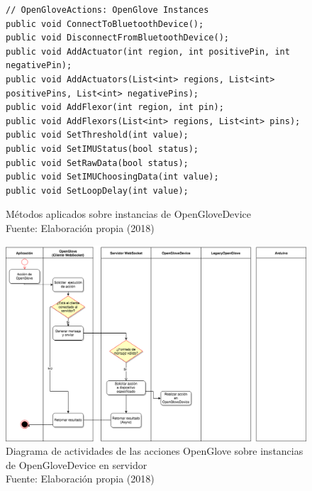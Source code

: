 \begin{figure}[H]
  \begin{center} 
\begin{lstlisting}
// OpenGloveActions: OpenGlove Instances
public void ConnectToBluetoothDevice();
public void DisconnectFromBluetoothDevice();
public void AddActuator(int region, int positivePin, int negativePin);
public void AddActuators(List<int> regions, List<int> positivePins, List<int> negativePins);
public void AddFlexor(int region, int pin);
public void AddFlexors(List<int> regions, List<int> pins);
public void SetThreshold(int value);
public void SetIMUStatus(bool status);
public void SetRawData(bool status);
public void SetIMUChoosingData(int value);
public void SetLoopDelay(int value);
\end{lstlisting}
   	\captionsetup{justification=centering}
    \caption[Métodos aplicados sobre instancias de OpenGloveDevice]{Métodos aplicados sobre instancias de OpenGloveDevice\\Fuente: Elaboración propia (2018)}
    \label{fig:methods-2-openglove-device}
  \end{center}
\end{figure}

\begin{figure}[H]
  \begin{center} 
   	\includegraphics[width=1.0\textwidth]{images/chapter04/ActivityDiagrams-OpenGloveActions-2.png} 
   	\captionsetup{justification=centering}
    \caption[Diagrama de actividades de las acciones OpenGlove sobre instancias de OpenGloveDevice en servidor]{Diagrama de actividades de las acciones OpenGlove sobre instancias de OpenGloveDevice en servidor\\Fuente: Elaboración propia (2018)}
    \label{fig:activity-diagrams-2-openglove-device}
  \end{center}
\end{figure}



